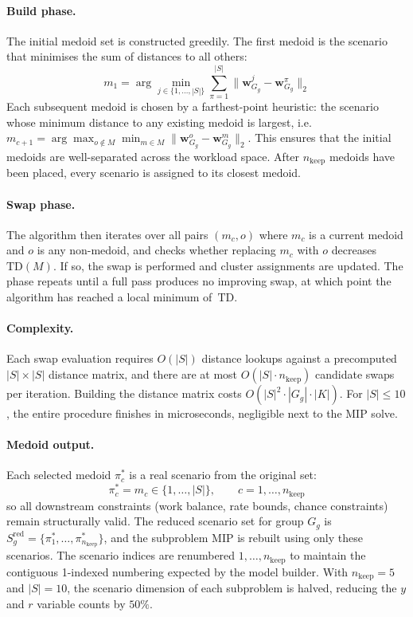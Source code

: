 \paragraph{Build phase.}
The initial medoid set is constructed greedily. The first medoid
is the scenario that minimises the sum of distances to all
others:
\begin{equation}
    m_1 = \arg\min_{j \in \{1,\ldots,|S|\}}
    \sum_{\pi=1}^{|S|}
    \bigl\|\mathbf{w}_{G_g}^{j} -
           \mathbf{w}_{G_g}^{\pi}\bigr\|_2
    \label{eq:pam_build_first}
\end{equation}
Each subsequent medoid is chosen by a farthest-point heuristic:
the scenario whose minimum distance to any existing medoid is
largest, i.e.\
$m_{c+1} = \arg\max_{o \notin M} \min_{m \in M}
\|\mathbf{w}_{G_g}^{o} - \mathbf{w}_{G_g}^{m}\|_2$.
This ensures that the initial medoids are well-separated across
the workload space. After $n_{\mathrm{keep}}$ medoids have
been placed, every scenario is assigned to its closest medoid.

\paragraph{Swap phase.}
The algorithm then iterates over all pairs $(m_c, o)$ where
$m_c$ is a current medoid and $o$ is any non-medoid, and checks
whether replacing $m_c$ with $o$ decreases $\mathrm{TD}(M)$.
If so, the swap is performed and cluster assignments are
updated. The phase repeats until a full pass produces no
improving swap, at which point the algorithm has reached a local
minimum of~$\mathrm{TD}$.

\paragraph{Complexity.}
Each swap evaluation requires $O(|S|)$ distance lookups against
a precomputed $|S| \times |S|$ distance matrix, and there are
at most $O(|S| \cdot n_{\mathrm{keep}})$ candidate swaps per
iteration. Building the distance matrix costs $O(|S|^2 \cdot
|G_g| \cdot |K|)$. For $|S| \leq 10$, the entire procedure
finishes in microseconds, negligible next to the MIP solve.

\paragraph{Medoid output.}
Each selected medoid $\pi_c^*$ is a real scenario from the
original set:
\begin{equation}
    \pi_c^* = m_c \in \{1, \ldots, |S|\},
    \qquad c = 1, \ldots, n_{\mathrm{keep}}
    \label{eq:medoid}
\end{equation}
so all downstream constraints (work balance, rate bounds, chance
constraints) remain structurally valid. The reduced scenario set
for group $G_g$ is $S_g^{\mathrm{red}} = \{\pi_{1}^*, \ldots,
\pi_{n_{\mathrm{keep}}}^*\}$, and the subproblem MIP is rebuilt
using only these scenarios. The scenario indices are renumbered
$1, \ldots, n_{\mathrm{keep}}$ to maintain the contiguous
1-indexed numbering expected by the model builder. With
$n_{\mathrm{keep}} = 5$ and $|S| = 10$, the scenario dimension
of each subproblem is halved, reducing the $y$ and $r$ variable
counts by $50\%$.

